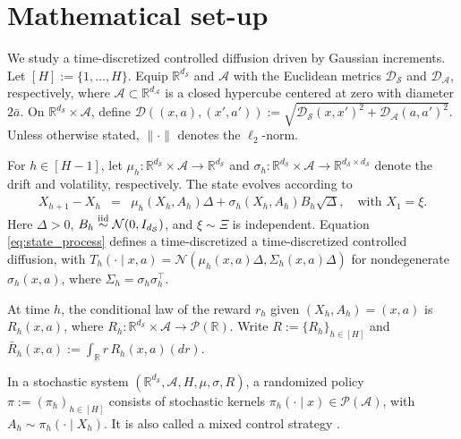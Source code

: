 \documentclass[final,supplement]{siamart251216}
\newcommand{\NN}{\mathcal{N}}
\begin{document}



\section{Mathematical set-up}\label{sec:set-up}
We study a time-discretized controlled diffusion driven by Gaussian increments. Let \([H]:=\{1,\ldots,H\}\). Equip \(\mathbb{R}^{d_{\mathcal S}}\) and \(\mathcal A\) with the Euclidean metrics \(\mathcal D_{\mathcal S}\) and \(\mathcal D_{\mathcal A}\), respectively, where \(\mathcal A\subset\mathbb{R}^{d_{\mathcal A}}\) is a closed hypercube centered at zero with diameter \(2\bar a\). On \(\mathbb{R}^{d_{\mathcal S}}\times\mathcal A\), define $\mathcal D((x,a),(x',a')):=\sqrt{\mathcal D_{\mathcal S}(x,x')^2+\mathcal D_{\mathcal A}(a,a')^2}$. Unless otherwise stated, \(\|\cdot\|\) denotes the \(\ell_2\)-norm.


For $h\in[H-1]$, let
$\mu_h:\mathbb R^{d_{\mathcal S}}\times\mathcal A\to\mathbb R^{d_{\mathcal S}}$
and
$\sigma_h:\mathbb R^{d_{\mathcal S}}\times\mathcal A
\to\mathbb R^{d_{\mathcal S}\times d_{\mathcal S}}$
denote the drift and volatility, respectively. The state evolves according to
\begin{eqnarray}\label{eq:state_process}
    X_{h+1}-X_{h}&=&\mu_h(X_{h},A_{h})\Delta+\sigma_h(X_{h},A_{h})B_{h}\sqrt{\Delta},\quad \textrm{with}\,\, X_{1}=\xi.
\end{eqnarray}
Here $\Delta>0$, $B_h\stackrel{\rm iid}{\sim}\mathcal N(0,I_{d_{\mathcal S}})$, and $\xi\sim\Xi$ is independent. Equation \eqref{eq:state_process} defines a time-discretized  a time-discretized controlled diffusion, with
$T_h(\cdot\mid x,a)=\NN(\mu_h(x,a)\Delta,\Sigma_h(x,a)\Delta)$ for nondegenerate $\sigma_h(x,a)$, where $\Sigma_h=\sigma_h\sigma_h^\top$.


At time $h$, the conditional law of the reward $r_h$ given
$(X_h,A_h)=(x,a)$ is $R_h(x,a)$, where
$R_h:\mathbb R^{d_{\mathcal S}}\times\mathcal A\to\mathcal P(\mathbb R)$.
Write $R:=\{R_h\}_{h\in[H]}$ and
$\bar R_h(x,a):=\int_{\mathbb R}r\,R_h(x,a)(dr)$.

In a stochastic system
$(\mathbb R^{d_{\mathcal S}},\mathcal A,H,\mu,\sigma,R)$, a randomized
policy $\pi:=(\pi_h)_{h\in[H]}$ consists of stochastic kernels
$\pi_h(\cdot\mid x)\in\mathcal P(\mathcal A)$, with
$A_h\sim\pi_h(\cdot\mid X_h)$. It is also called a mixed control strategy
\cite{yong1999stochastic}.
\end{document}
